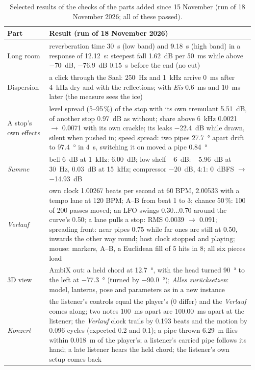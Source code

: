 \documentclass[11pt,a4paper,parskip=half,DIV=11,toc=bibliography]{scrartcl}
\newcommand{\ui}[1]{\emph{#1}}                 %
\begin{document}
\begin{table}[!htb]
\centering\small
\begin{tabularx}{\linewidth}{@{}lX@{}}
\toprule
Part & Result (run of 18 November 2026) \\
\midrule
Long room & reverberation time \SI{30}{s} (low band) and \SI{9.18}{s} (high band) in a response of \SI{12.12}{s}: steepest fall \SI{1.62}{dB} per \SI{50}{ms} while above \SI{-70}{dB}, \SI{-76.9}{dB} \SI{0.15}{s} before the end (no cut) \\
Dispersion & a click through the Saal: \SI{250}{Hz} and \SI{1}{kHz} arrive \SI{0}{ms} after \SI{4}{kHz} dry and with the reflections; with \ui{Eis} \SI{0.6}{ms} and \SI{10}{ms} later (the measure sees the ice) \\
A stop's own effects & level spread (5--95\,\%) of the stop with its own tremulant \SI{5.51}{dB}, of another stop \SI{0.97}{dB} as without; share above \SI{6}{kHz} 0.0021 $\rightarrow$ 0.0071 with its own crackle; its leaks \SI{-22.4}{dB} while drawn, silent when pushed in; speed spread: two pipes \SI{27.7}{\degree} apart drift to \SI{97.4}{\degree} in \SI{4}{s}, switching it on moved a pipe \SI{0.84}{\degree} \\
\ui{Summe} & bell \SI{+6}{dB} at \SI{1}{kHz}: \SI{+6.00}{dB}; low shelf \SI{-6}{dB}: \SI{-5.96}{dB} at \SI{30}{Hz}, \SI{0.03}{dB} at \SI{15}{kHz}; compressor \SI{-20}{dB}, 4:1: \SI{0}{dBFS} $\rightarrow$ \SI{-14.93}{dB} \\
\ui{Verlauf} & own clock 1.00267 beats per second at 60 BPM, 2.00533 with a tempo lane at 120 BPM; A--B from beat 1 to 3; chance 50\,\%: 100 of 200 passes moved; an LFO swings $0.30\dots0.70$ around the curve's 0.50; a lane pulls a stop: RMS 0.0039 $\rightarrow$ 0.091; spreading front: near pipes 0.75 while far ones are still at 0.50, inwards the other way round; host clock stopped and playing; mouse: markers, A--B, a Euclidean fill of 5 hits in 8; all six pieces load \\
3D view & AmbiX out: a held chord at \SI{12.7}{\degree}, with the head turned \SI{90}{\degree} to the left at \SI{-77.3}{\degree} (turned by \SI{-90.0}{\degree}); \ui{Alles zurücksetzen}: model, lanterns, pose and parameters as in a new instance \\
\ui{Konzert} & the listener's controls equal the player's (0 differ) and the \ui{Verlauf} comes along; two notes \SI{100}{ms} apart are \SI{100.00}{ms} apart at the listener; the \ui{Verlauf} clock trails by 0.193 beats and the motion by 0.096 cycles (expected 0.2 and 0.1); a pipe thrown \SI{6.29}{m} flies within \SI{0.018}{m} of the player's; a listener's carried pipe follows its hand; a late listener hears the held chord; the listener's own setup comes back \\
\bottomrule
\end{tabularx}
\caption{Selected results of the checks of the parts added since 15 November (run of 18 November 2026; all of these passed).}
\label{tab:tests3}
\end{table}
\end{document}
